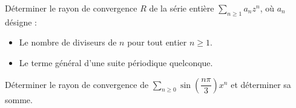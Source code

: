 \documentclass[a4paper,10pt]{report}
\newcommand{\Sum}[2]{\ensuremath{\textstyle{\sum\limits_{#1}^{#2}}}}
\begin{document}
\begin{Exa} Déterminer le rayon de convergence $R$ de la série entière $\Sum{n\geq 1}{} a_n z^n$, où $a_n$ désigne : 
\begin{itemize}
\item Le nombre de diviseurs de $n$ pour tout entier $n\geq 1$.
\item Le terme général d'une suite périodique quelconque. 
\end{itemize}
\end{Exa}


\begin{Exa}
Déterminer le rayon de convergence de $\Sum{n\geq 0}{} \sin \left( \dfrac{n \pi}{3} \right) x^n$ et déterminer sa somme.
\end{Exa}
\end{document}
